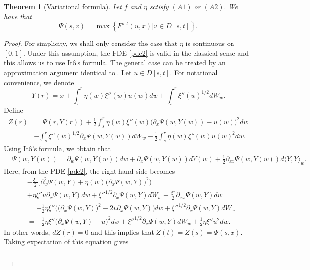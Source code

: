 \documentclass[12pt]{article}
\def\la{\langle}
\def\ra{\rangle}
\newtheorem{theorem}{\bf Theorem}
\newenvironment{Proof of lemma}{\noindent{\bf Proof of Lemma}}{\hfill$\Box$\newline}
\newenvironment{Proof of theorem}{\noindent{\bf Proof of Theorem}}{\hfill{\footnotesize${\square}$}\newline}
\newenvironment{Proof of theorems}{\noindent{\bf Proof of Theorems}}{\hfill$\Box$\newline}
\newenvironment{Proof of proposition}{\noindent{\bf Proof of Proposition}}{\hfill$\Box$\newline}
\newenvironment{Proof of propositions}{\noindent{\bf Proof of Propositions}}{\hfill$\Box$\newline}
\newenvironment{Proof of exercise}{\noindent{\it Proof of Exercise:}}{\hfill$\Box$}
\begin{document}
\begin{theorem}[Variational formula] \label{thm0}
	Let $f$ and $\eta$ satisfy $(A1)$ or $(A2).$  
We have that 
        \begin{equation*}
		\Psi(s,x)=\max\left\{F^{s,t}(u,x)|u\in D[s,t]\right\}.
		\end{equation*}
			

	
\end{theorem}

\begin{proof}
	For simplicity, we shall only consider the case that $\eta$ is continuous on $[0,1]$. Under this assumption, the PDE \eqref{pde2} is valid in the classical sense and this allows us to use It\^{o}'s formula. The general case can be treated by an approximation argument identical to \cite[Theorem 3]{AC14}.
	Let $u\in D[s,t].$ For notational convenience, we denote $$Y(r)=x+\int_s^r\eta(w)\xi''(w)u(w)dw+\int_s^r\xi''(w)^{1/2}dW_w.$$
	Define 
	\begin{align*}
	Z(r)&=\Psi(r,Y(r))+\frac{1}{2}\int_s^r\eta(w)\xi''(w)\bigl(\partial_x\Psi(w,Y(w))-u(w)\bigr)^2dw\\
	&-\int_s^r\xi''(w)^{1/2}\partial_x\Psi(w,Y(w))dW_w-\frac{1}{2}\int_s^r\eta(w)\xi''(w)u(w)^2dw.
	\end{align*} 
	Using It\^{o}'s formula, we obtain that
	\begin{align*}
	&\Psi(w,Y(w))=\partial_w\Psi(w,Y(w))dw+\partial_x\Psi(w,Y(w))dY(w)+\frac{1}{2}\partial_{xx}\Psi(w,Y(w))d\la Y, Y \ra_w.
	\end{align*}
	Here, from the PDE \eqref{pde2}, the right-hand side becomes
	\begin{align*}
	&-\frac{\xi''}{2}\bigl(\partial_w^2\Psi(w,Y)+\eta(w)\bigl(\partial_x\Psi(w,Y)\bigr)^2\bigr)\\
	&+\eta \xi'' u \partial_x\Psi(w,Y )dw+{\xi''}^{1/2}\partial_x\Psi(w,Y )dW_w+\frac{\xi''}{2}\partial_{xx}\Psi(w,Y )dw\\
	&=-\frac{1}{2}\eta \xi'' \bigl(\bigl(\partial_x\Psi(w,Y )\bigr)^2-2u \partial_x\Psi(w,Y )\bigr)dw+{\xi''}^{1/2}\partial_x\Psi(w,Y )dW_w\\
	&=-\frac{1}{2}\eta \xi'' \bigl(\partial_x\Psi(w,Y )-u \bigr)^2dw+{\xi''}^{1/2}\partial_x\Psi(w,Y )dW_w+\frac{1}{2}\eta \xi'' u^2dw.
	\end{align*}
	In other words, $dZ(r)=0$ and this implies that $Z(t)=Z(s)=\Psi(s,x)$. Taking expectation of this equation gives 
	\begin{align}
	\begin{split}\label{lem:proof:eq1}

\end{split}
\end{align}
\end{proof}
\end{document}
